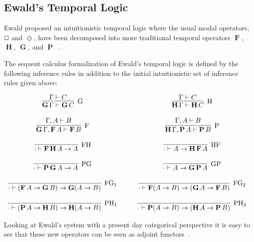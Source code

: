 \documentclass{article}
\renewcommand{\Box}{\oblong}
\newcommand{\F}{\mathop{\textbf{F}}}
\renewcommand{\P}{\mathop{\textbf{P}}}
\newcommand{\G}{\mathop{\textbf{G}}}
\renewcommand{\H}{\mathop{\textbf{H}}}
\begin{document}
\subsection{Ewald's Temporal Logic}

Ewald proposed an intuitionistic temporal logic where the usual modal operators, $\Box$ and $\Diamond$, have been decomposed into more
traditional temporal operators  $\F$, $\H$, $\G$, and $\P$~\cite{ewald1986}.  

The sequent calculus formalization of Ewald's
temporal logic is defined by the following inference rules in addition
to the initial intuitionistic set of inference rules given above:
\begin{center}
  \small
  \begin{math}
    \begin{array}{cccccc}
      \infer[\text{G}]{\G \Gamma \vdash \G C}{
        \Gamma \vdash C
      }
      & \quad &
      \infer[\text{H}]{\H\Gamma \vdash \H C}{
        \Gamma \vdash C
      }\\\\
      \infer[\text{F}]{\G\Gamma,\F A \vdash \F B}{
        \Gamma,A \vdash B
      }
      & \quad &
      \infer[\text{P}]{\H\Gamma,\P A \vdash \P B}{
        \Gamma,A \vdash B
      }\\\\
      \infer[\text{FH}]{\cdot \vdash \F\H A \to A}{
        \,
      }
      & \quad &
      \infer[\text{HF}]{\cdot \vdash A \to \H\F A}{
        \,
      }\\\\
      \infer[\text{PG}]{\cdot \vdash \P\G A \to A}{
        \,
      }
      & \quad &
      \infer[\text{GP}]{\cdot \vdash A \to \G\P A}{
        \,
      }\\\\
      \infer[\text{FG}_1]{\cdot \vdash (\F A \to \G B) \to \G(A \to B)}{
        \,
      }
      & \quad &
      \infer[\text{FG}_2]{\cdot \vdash \F(A \to B) \to (\G A \to \F B)}{
        \,
      }\\\\
      \infer[\text{PH}_1]{\cdot \vdash (\P A \to \H B) \to \H(A \to B)}{
        \,
      }
      & \quad &
      \infer[\text{PH}_2]{\cdot \vdash \P(A \to B) \to (\H A \to \P B)}{
        \,
      }      
    \end{array}
  \end{math}
\end{center}
Looking at Ewald's system  with a present day categorical perspective it is easy to see that these new operators can be seen as adjoint functors~\cite{Menni:2014}.  
\end{document}
